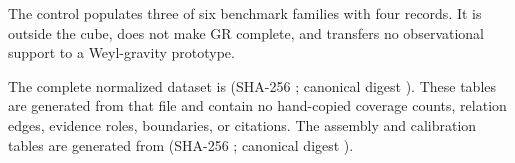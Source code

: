 The control populates three of six benchmark families with four records.  It is outside the cube, does not make GR complete, and transfers no observational support to a Weyl-gravity prototype.

The complete normalized dataset is  (SHA-256 ; canonical digest ).  These tables are generated from that file and contain no hand-copied coverage counts, relation edges, evidence roles, boundaries, or citations.
The assembly and calibration tables are generated from  (SHA-256 ; canonical digest ).

